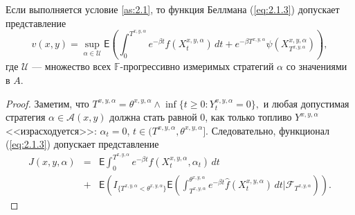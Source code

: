 \begin{lemma} \label{lem:2.1}
Если выполняется условие \ref{as:2.1}, то функция Беллмана (\ref{eq:2.1.3}) допускает представление
\begin{equation} \label{eq:2.2.6}
 v(x,y)=\sup_{\alpha\in\mathcal U}\mathsf E\left(\int_0^{T^{x,y,\alpha}} e^{-\beta t} f(X_t^{x,y,\alpha})\,dt+e^{-\beta T^{x,y,\alpha}}\psi(X_{T^{x,y,\alpha}}^{x,y,\alpha})\right),
\end{equation}
где $\mathcal U$ --- множество всех $\mathbb F$-прогрессивно измеримых стратегий $\alpha$ со значениями в $A$.
\end{lemma}
\begin{proof} Заметим, что
$T^{x,y,\alpha}=\theta^{x,y,\alpha}\wedge\inf\{t\ge 0:Y_t^{x,y,\alpha}=0\},$
и любая допустимая стратегия $\alpha\in\mathcal A(x,y)$ должна стать равной  $0$, как только топливо $Y^{x,y,\alpha}$ <<израсходуется>>: $\alpha_t=0$, $t\in (T^{x,y,\alpha},\theta^{x,y,\alpha}]$. Следовательно, функционал (\ref{eq:2.1.3}) допускает представление
\begin{eqnarray} \label{eq:2.2.7}
J(x,y,\alpha)&=&\mathsf E\int_0^{T^{x,y,\alpha}} e^{-\beta t} f(X_t^{x,y,\alpha},\alpha_t)\,dt \nonumber\\
&+&\mathsf E\left(I_{\{T^{x,y,\alpha}<\theta^{x,y,\alpha}\}}\mathsf E\left(\int_{T^{x,y,\alpha}}^{\theta^{x,y,\alpha}} e^{-\beta t} \widehat f(X_t^{x,y,\alpha}) \,dt\biggr|\mathscr F_{T^{x,y,\alpha}}\right)\right).
\end{eqnarray}


\end{proof}
